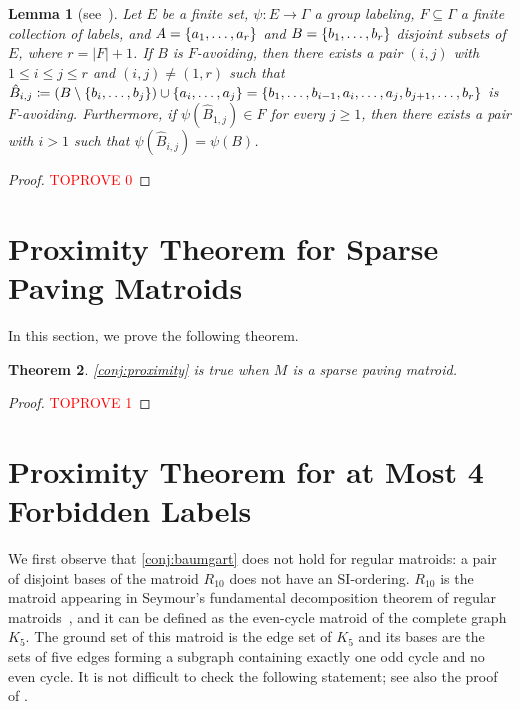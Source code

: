 \documentclass{article}
\DeclarePairedDelimiter{\set}{\{}{\}}
\newtheorem{theorem}{Theorem}[section]
\newtheorem{lemma}[theorem]{Lemma}
\theoremstyle{definition}
\begin{document}
\begin{lemma}[see~\cite{horsch2024problems_arxiv}]\label{lem:pigeon}
    Let $E$ be a finite set, $\psi\colon E\to \Gamma$ a group labeling, $F\subseteq \Gamma$ a finite collection of labels, and $A=\set{a_1,\dots, a_r}$ and $B=\set{b_1,\dots, b_r}$ disjoint subsets of $E$, where $r=|F|+1$.
    If $B$ is $F$-avoiding, then there exists a pair $(i,j)$ with $1 \le i \le j \le r$ and $(i,j) \ne (1,r)$ such that $\hat{B}_{i,j}\coloneqq (B \setminus \set{b_i, \dotsc, b_j}) \cup \set{a_i, \dotsc, a_j} = \set{b_1,\dotsc, b_{i-1}, a_{i},\dotsc, a_j, b_{j+1},\dotsc, b_r}$ is $F$-avoiding.
    Furthermore, if $\psi(\hat{B}_{1,j}) \in F$ for every $j \ge 1$, then there exists a pair with $i > 1$ such that $\psi(\hat{B}_{i,j}) = \psi(B)$.
\end{lemma}
\begin{proof}\textcolor{red}{TOPROVE 0}\end{proof}


\section{Proximity Theorem for Sparse Paving Matroids}\label{sec:sparse-paving}
In this section, we prove the following theorem.

\begin{theorem}\label{thm:proximity-sparse-paving}
    \cref{conj:proximity} is true when $M$ is a sparse paving matroid.
\end{theorem}

\begin{proof}\textcolor{red}{TOPROVE 1}\end{proof}



\section{Proximity Theorem for at Most 4 Forbidden Labels}\label{sec:four-forbidden}

We first observe that \cref{conj:baumgart} does not hold for regular matroids: a pair of disjoint bases of the matroid $R_{10}$ does not have an SI-ordering. 
$R_{10}$ is the matroid appearing in Seymour's fundamental decomposition theorem of regular matroids~\cite{seymour1980decomposition}, and it can be defined as the even-cycle matroid of the complete graph $K_5$.
The ground set of this matroid is the edge set of $K_5$ and its bases are the sets of five edges forming a subgraph containing exactly one odd cycle and no even cycle.
It is not difficult to check the following statement; see also the proof of \cite[Proposition~5.5]{berczi2023reconfiguration}.
\end{document}
